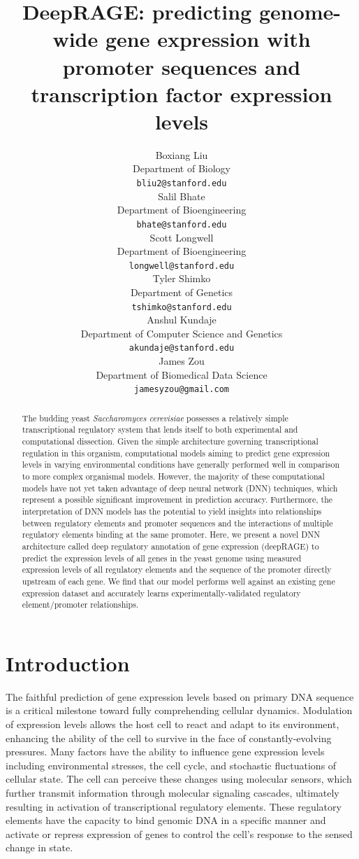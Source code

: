 \documentclass{article}
\title{DeepRAGE: predicting genome-wide gene expression with promoter sequences and transcription factor expression levels}
\author{
  Boxiang Liu \\
  Department of Biology\\
  \texttt{bliu2@stanford.edu} \\
  \And
  Salil Bhate \\
  Department of Bioengineering\\
  \texttt{bhate@stanford.edu} \\
  \AND
  Scott Longwell \\
  Department of Bioengineering\\
  \texttt{longwell@stanford.edu} \\
  \And
  Tyler Shimko \\
  Department of Genetics\\
  \texttt{tshimko@stanford.edu} \\
  \And
  Anshul Kundaje \\
  Department of Computer Science and Genetics\\
  \texttt{akundaje@stanford.edu} \\
  \And
  James Zou \\
  Department of Biomedical Data Science\\
  \texttt{jamesyzou@gmail.com}
 }
\begin{document}
\maketitle

\begin{abstract}

The budding yeast \textit{Saccharomyces cerevisiae} possesses a relatively simple transcriptional regulatory system that lends itself to both experimental and computational dissection. Given the simple architecture governing transcriptional regulation in this organism, computational models aiming to predict gene expression levels in varying environmental conditions have generally performed well in comparison to more complex organismal models. However, the majority of these computational models have not yet taken advantage of deep neural network (DNN) techniques, which represent a possible significant improvement in prediction accuracy. Furthermore, the interpretation of DNN models has the potential to yield insights into relationships between regulatory elements and promoter sequences and the interactions of multiple regulatory elements binding at the same promoter. Here, we present a novel DNN architecture called deep regulatory annotation of gene expression (deepRAGE) to predict the expression levels of all genes in the yeast genome using measured expression levels of all regulatory elements and the sequence of the promoter directly upstream of each gene. We find that our model performs well against an existing gene expression dataset and accurately learns experimentally-validated regulatory element/promoter relationships.
  
\end{abstract}

\section{Introduction}

The faithful prediction of gene expression levels based on primary DNA sequence is a critical milestone toward fully comprehending cellular dynamics. Modulation of expression levels allows the host cell to react and adapt to its environment, enhancing the ability of the cell to survive in the face of constantly-evolving pressures. Many factors have the ability to influence gene expression levels including environmental stresses, the cell cycle, and stochastic fluctuations of cellular state. The cell can perceive these changes using molecular sensors, which further transmit information through molecular signaling cascades, ultimately resulting in activation of transcriptional regulatory elements. These regulatory elements have the capacity to bind genomic DNA in a specific manner and activate or repress expression of genes to control the cell's response to the sensed change in state.
\end{document}
